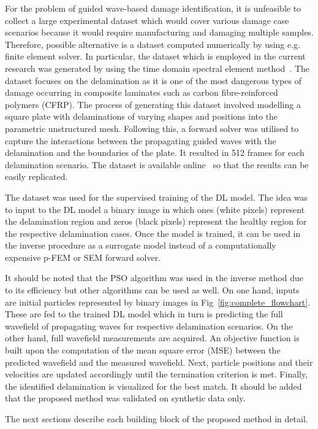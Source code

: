 For the problem of guided wave-based damage identification, it is unfeasible to collect a large experimental dataset which would cover various damage case scenarios because it would require manufacturing and damaging multiple samples.
Therefore, possible alternative is a dataset computed numerically by using e.g. finite element solver.
In particular, the dataset which is employed in the current research was generated by using the time domain spectral element method~\cite{Kudela2020}.
The dataset focuses on the delamination as it is one of the most dangerous types of damage occurring in composite laminates such as carbon fibre-reinforced polymers (CFRP).
The process of generating this dataset involved modelling a square plate with delaminations of varying shapes and positions into the parametric unstructured mesh. 
Following this, a forward solver was utilised to capture the interactions between the propagating guided waves with the delamination and the boundaries of the plate.
It resulted in 512 frames for each delamination scenario.
The dataset is available online~\cite{kudela_pawel_2021_5414555} so that the results can be easily replicated.

The dataset was used for the supervised training of the DL model.
The idea was to input to the DL model a binary image in which ones (white pixels) represent  the delamination region and zeros (black pixels) represent the healthy region for the respective delamination cases.
Once the model is trained, it can be used in the inverse procedure as a surrogate model instead of a computationally expensive p-FEM or SEM forward solver.

It should be noted that the PSO algorithm was used in the inverse method due to its efficiency but other algorithms can be used as well. 
On one hand, inputs are initial particles represented by binary images in Fig~\ref{fig:complete_flowchart}.
These are fed to the trained DL model which in turn is predicting the full wavefield of propagating waves for respective delamination scenarios.
On the other hand, full wavefield measurements are acquired. 
An objective function is built upon the computation of the mean square error (MSE) between the predicted wavefield and the measured wavefield.
Next, particle positions and their velocities are updated accordingly until the termination criterion is met.
Finally, the identified delamination is visualized for the best match.
It should be added that the proposed method was validated on synthetic data only. 

The next sections describe each building block of the proposed method in detail.

